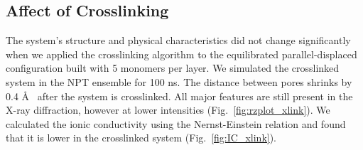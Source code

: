 \documentclass{article}
\newcommand{\angstrom}{\textup{\AA}}
\begin{document}
  \subsection{Affect of Crosslinking}\label{section:xlink}

  The system's structure and physical characteristics did not change
  significantly when we applied the crosslinking algorithm to the equilibrated
  parallel-displaced configuration built with 5 monomers per layer. We simulated
  the crosslinked system in the NPT ensemble for 100 ns. The distance between
  pores shrinks by 0.4 \angstrom~ after the system is crosslinked. All major
  features are still present in the X-ray diffraction, however at lower
  intensities (Fig.~\ref{fig:rzplot_xlink}). We calculated the ionic conductivity using
  the Nernst-Einstein relation and found that it is lower in the crosslinked
  system (Fig.~\ref{fig:IC_xlink}).
\end{document}
